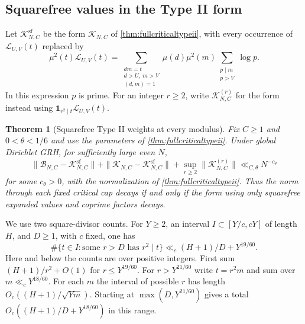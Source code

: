 \documentclass[11pt,a4paper]{article}
\numberwithin{equation}{section}
\newtheorem{theorem}{Theorem}[section]
\begin{document}
\subsection{Squarefree values in the Type II form}

Let $\mathcal K^{\mathrm{sf}}_{N,C}$ be the form
$\mathcal K_{N,C}$ of \cref{thm:fullcriticaltypeii},
with every occurrence of $\mathcal L_{U,V}(t)$ replaced by
\begin{equation}
 \mu^2(t)\mathcal L_{U,V}(t)
  =\sum_{\substack{dm=t\\d>U,\ m>V\\(d,m)=1}}
        \mu(d)\mu^2(m)\sum_{\substack{p\mid m\\p>V}}\log p .
 \label{eq:squarefreevaughan}
\end{equation}
In this expression $p$ is prime. For an integer $r\ge2$,
write $\mathcal K^{(r)}_{N,C}$ for the form instead using
$\mathbf1_{r^2\mid t}\mathcal L_{U,V}(t)$.

\begin{theorem}[Squarefree Type II weights at every modulus]
\label{thm:squarefreecriticaltypeii}
Fix $C\ge1$ and $0<\theta<1/6$ and use the parameters
of \cref{thm:fullcriticaltypeii}. Under global Dirichlet GRH,
for sufficiently large even $N$,
\begin{equation}
 \|\mathcal B_{N,C}-\mathcal K^{\mathrm{sf}}_{N,C}\|
  +\|\mathcal K_{N,C}-\mathcal K^{\mathrm{sf}}_{N,C}\|
  +\sup_{r\ge2}\|\mathcal K^{(r)}_{N,C}\|
          \ll_{C,\theta} N^{-c_\theta}
 \label{eq:squarefreecriticaltypeii}
\end{equation}
for some $c_\theta>0$, with the normalization of
\cref{thm:fullcriticaltypeii}. Thus the norm through each
fixed critical cap decays if and only if the form using
only squarefree expanded values and coprime factors decays.
\end{theorem}

We use two square-divisor counts. For $Y\ge2$, an interval
$I\subset[Y/c,cY]$ of length $H$, and $D\ge1$, with $c$
fixed, one has
\begin{equation}
 \#\{t\in I:\text{some }r>D\text{ has }r^2\mid t\}
      \ll_c (H+1)/D+Y^{19/60}.
 \label{eq:largesquareinterval}
\end{equation}
Here and below the counts are over positive integers.
First sum $(H+1)/r^2+O(1)$ for $r\le Y^{19/60}$.
For $r>Y^{21/60}$ write $t=r^2m$ and sum over
$m\ll_c Y^{18/60}$. For each $m$ the interval of
possible $r$ has length $O_c((H+1)/\sqrt{Ym})$.
Starting at $\max(D,Y^{21/60})$ gives a total
$O_c((H+1)/D+Y^{18/60})$ in this range.
\end{document}
